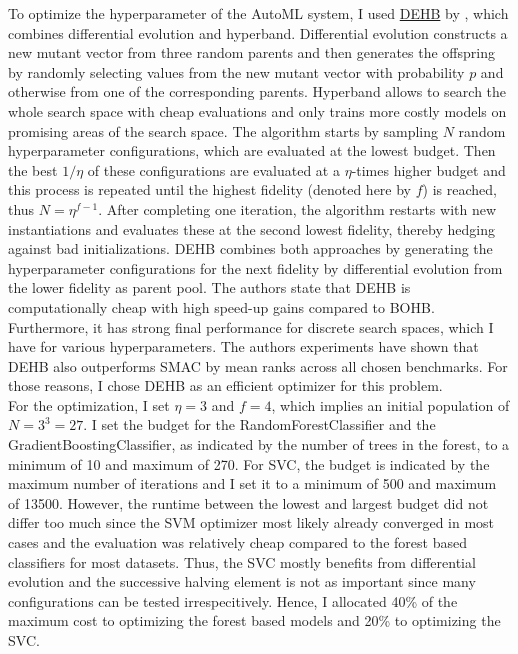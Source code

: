 \documentclass[11pt]{article}
\begin{document}
To optimize the hyperparameter of the AutoML system, I used \href{https://github.com/automl/dehb}{DEHB} by \citet{dehb}, which combines differential evolution and hyperband. Differential evolution constructs a new mutant vector from three random parents and then generates the offspring by randomly selecting values from the new mutant vector with probability $p$ and otherwise from one of the corresponding parents. Hyperband allows to search the whole search space with cheap evaluations and only trains more costly models on promising areas of the search space. The algorithm starts by sampling $N$ random hyperparameter configurations, which are evaluated at the lowest budget. Then the best $1/\eta$ of these configurations are evaluated at a $\eta$-times higher budget and this process is repeated until the highest fidelity (denoted here by $f$) is reached, thus $N=\eta^{f-1}$. After completing one iteration, the algorithm restarts with new instantiations and evaluates these at the second lowest fidelity, thereby hedging against bad initializations. DEHB combines both approaches by generating the hyperparameter configurations for the next fidelity by differential evolution from the lower fidelity as parent pool. The authors state that DEHB is computationally cheap with high speed-up gains compared to BOHB. Furthermore, it has strong final performance for discrete search spaces, which I have for various hyperparameters. The authors experiments have shown that DEHB also outperforms SMAC by mean ranks across all chosen benchmarks. For those reasons, I chose DEHB as an efficient optimizer for this problem. \\

For the optimization, I set $\eta=3$ and $f=4$, which implies an initial population of $N=3^{3}=27$. I set the budget for the RandomForestClassifier and the GradientBoostingClassifier, as indicated by the number of trees in the forest, to a minimum of 10 and maximum of 270. For SVC, the budget is indicated by the maximum number of iterations and I set it to a minimum of 500 and maximum of 13500. However, the runtime between the lowest and largest budget did not differ too much since the SVM optimizer most likely already converged in most cases and the evaluation was relatively cheap compared to the forest based classifiers for most datasets. Thus, the SVC mostly benefits from differential evolution and the successive halving element is not as important since many configurations can be tested irrespecitively. Hence, I allocated 40\% of the maximum cost to optimizing the forest based models and 20\% to optimizing the SVC. \\
\end{document}
